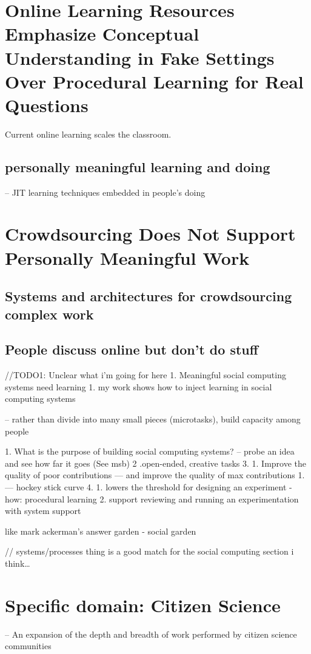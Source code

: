 \section{Online Learning Resources Emphasize Conceptual Understanding in Fake Settings Over Procedural Learning for Real Questions}

Current online learning scales the classroom.

\subsection{personally meaningful learning and doing}
-- JIT learning techniques embedded in people’s doing

\section{Crowdsourcing Does Not Support Personally Meaningful Work}


\subsection{Systems and architectures for crowdsourcing complex work}


\subsection{People discuss online but don't do stuff}
//TODO1: Unclear what i'm going for here
1. Meaningful social computing systems need learning
    1. my work shows how to inject learning in social computing systems

-- rather than divide into many small pieces (microtasks), build capacity among people

1. What is the purpose of building social computing systems?
-- probe an idea and see how far it goes (See msb)
2 .open-ended, creative tasks
3. 1. Improve the quality of poor contributions — and improve the quality of max contributions 
    1. — hockey stick curve 
4.
    1. lowers the threshold for designing an experiment - how: procedural learning
    2. support reviewing and running an experimentation with system support

like mark ackerman’s answer garden - social garden

// systems/processes thing is a good match for the social computing section i think…


\section{Specific domain: Citizen Science}
-- An expansion of the depth and breadth of work performed by citizen science communities

